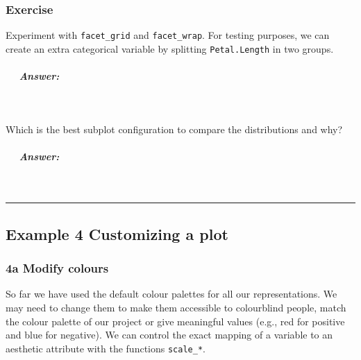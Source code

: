 \documentclass[
]{article}
\newenvironment{Shaded}{\begin{snugshade}}{\end{snugshade}}
\newcommand{\DecValTok}[1]{\textcolor[rgb]{0.00,0.00,0.81}{#1}}
\newcommand{\NormalTok}[1]{#1}
\newcommand{\OtherTok}[1]{\textcolor[rgb]{0.56,0.35,0.01}{#1}}
\newcommand{\SpecialCharTok}[1]{\textcolor[rgb]{0.81,0.36,0.00}{\textbf{#1}}}
\newcommand{\StringTok}[1]{\textcolor[rgb]{0.31,0.60,0.02}{#1}}
\begin{document}
\subsubsection{\texorpdfstring{ Exercise}{ Exercise}}\label{exercise-2}

Experiment with \texttt{facet\_grid} and \texttt{facet\_wrap}. For
testing purposes, we can create an extra categorical variable by
splitting \texttt{Petal.Length} in two groups.

\begin{Shaded}
\end{Shaded}

\subparagraph{  Answer:}\label{answer-4}

 

Which is the best subplot configuration to compare the distributions and
why?

\subparagraph{  Answer:}\label{answer-5}

 

\begin{center}\rule{0.5\linewidth}{0.5pt}\end{center}

\subsection{\texorpdfstring{ \textbf{Example 4} \textbar{} Customizing a
plot}{ Example 4 \textbar{} Customizing a plot}}\label{example-4-customizing-a-plot}

\subsubsection{\texorpdfstring{\textbf{4a} \textbar{} Modify
colours}{4a \textbar{} Modify colours}}\label{a-modify-colours}

So far we have used the default colour palettes for all our
representations. We may need to change them to make them accessible to
colourblind people, match the colour palette of our project or give
meaningful values (e.g., red for positive and blue for negative). We can
control the exact mapping of a variable to an aesthetic attribute with
the functions \texttt{scale\_*}.
\end{document}
